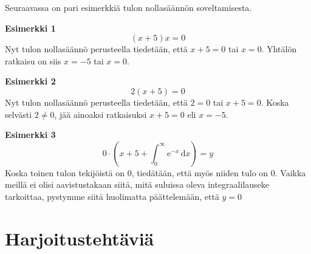 Seuraavassa on pari esimerkkiä tulon nollasäännön soveltamisesta.

\textbf{Esimerkki 1}
\[(x+5)x=0\]
Nyt tulon nollasäännö perusteella tiedetään, että $x+5=0$ tai $x=0$. Yhtälön ratkaisu on siis $x=-5$ tai $x=0$.

\textbf{Esimerkki 2}
\[2(x+5)=0\]
Nyt tulon nollasäännö perusteella tiedetään, että $2=0$ tai $x+5=0$.
Koska selvästi $2\neq 0$, jää ainoaksi ratkaisuksi $x+5=0$ eli $x=-5$.

\textbf{Esimerkki 3}
\[0\cdot(x+5+\int_0^\infty \mathrm{e}^{-x}\,\mathrm{d}x)=y\]
Koska toinen tulon tekijöistä on $0$, tiedätään, että myös niiden tulo on $0$.
Vaikka meillä ei olisi aavistustakaan siitä, mitä suluissa oleva integraalilauseke tarkoittaa,
pystymme siitä huolimatta päättelemään, että $y=0$

\section{Harjoitustehtäviä}
